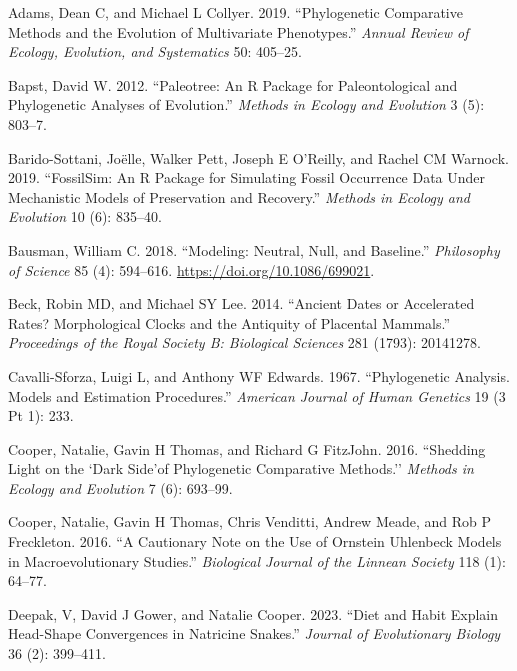 \documentclass[
]{article}
\newlength{\cslhangindent}
\newenvironment{cslreferences}%
  {\setlength{\parindent}{0pt}%
  \everypar{\setlength{\hangindent}{\cslhangindent}}\ignorespaces}%
  {\par}
\begin{document}
\hypertarget{refs}{}
\begin{cslreferences}
\leavevmode\hypertarget{ref-adams2019multivarPCM}{}%
Adams, Dean C, and Michael L Collyer. 2019. ``Phylogenetic Comparative
Methods and the Evolution of Multivariate Phenotypes.'' \emph{Annual
Review of Ecology, Evolution, and Systematics} 50: 405--25.

\leavevmode\hypertarget{ref-paleotree}{}%
Bapst, David W. 2012. ``Paleotree: An R Package for Paleontological and
Phylogenetic Analyses of Evolution.'' \emph{Methods in Ecology and
Evolution} 3 (5): 803--7.

\leavevmode\hypertarget{ref-fossilsim}{}%
Barido-Sottani, Joëlle, Walker Pett, Joseph E O'Reilly, and Rachel CM
Warnock. 2019. ``FossilSim: An R Package for Simulating Fossil
Occurrence Data Under Mechanistic Models of Preservation and Recovery.''
\emph{Methods in Ecology and Evolution} 10 (6): 835--40.

\leavevmode\hypertarget{ref-bausman2018neutral}{}%
Bausman, William C. 2018. ``Modeling: Neutral, Null, and Baseline.''
\emph{Philosophy of Science} 85 (4): 594--616.
\url{https://doi.org/10.1086/699021}.

\leavevmode\hypertarget{ref-beck2014ancient}{}%
Beck, Robin MD, and Michael SY Lee. 2014. ``Ancient Dates or Accelerated
Rates? Morphological Clocks and the Antiquity of Placental Mammals.''
\emph{Proceedings of the Royal Society B: Biological Sciences} 281
(1793): 20141278.

\leavevmode\hypertarget{ref-cavalli1967BM}{}%
Cavalli-Sforza, Luigi L, and Anthony WF Edwards. 1967. ``Phylogenetic
Analysis. Models and Estimation Procedures.'' \emph{American Journal of
Human Genetics} 19 (3 Pt 1): 233.

\leavevmode\hypertarget{ref-cooper2016dark}{}%
Cooper, Natalie, Gavin H Thomas, and Richard G FitzJohn. 2016.
``Shedding Light on the `Dark Side'of Phylogenetic Comparative
Methods.'' \emph{Methods in Ecology and Evolution} 7 (6): 693--99.

\leavevmode\hypertarget{ref-cooper2016cautionary}{}%
Cooper, Natalie, Gavin H Thomas, Chris Venditti, Andrew Meade, and Rob P
Freckleton. 2016. ``A Cautionary Note on the Use of Ornstein Uhlenbeck
Models in Macroevolutionary Studies.'' \emph{Biological Journal of the
Linnean Society} 118 (1): 64--77.

\leavevmode\hypertarget{ref-deepak2023diet}{}%
Deepak, V, David J Gower, and Natalie Cooper. 2023. ``Diet and Habit
Explain Head-Shape Convergences in Natricine Snakes.'' \emph{Journal of
Evolutionary Biology} 36 (2): 399--411.


\end{cslreferences}
\end{document}
